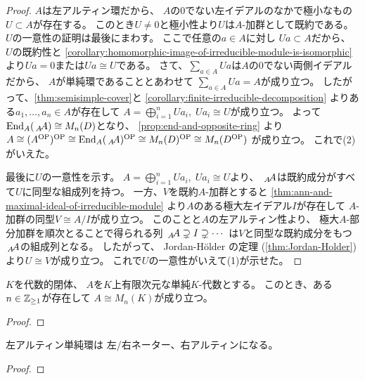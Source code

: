 \documentclass[report]{jlreq}
\begin{document}
\begin{proof}
    $A$は左アルティン環だから、
    $A$の$0$でない左イデアルのなかで極小なもの$U \subset A$が存在する。
    このとき$U \neq 0$と極小性より$U$は$A$-加群として既約である。
    $U$の一意性の証明は最後にまわす。
    ここで任意の$a \in A$に対し
    $Ua \subset A$だから、
    $U$の既約性と
    \cref{corollary:homomorphic-image-of-irreducible-module-is-isomorphic}
    より$Ua = 0$または$Ua \cong U$である。
    さて、$\sum_{a \in A} Ua$は$A$の$0$でない両側イデアルだから、
    $A$が単純環であることとあわせて
    $\sum_{a \in A} Ua = A$が成り立つ。
    したがって、\cref{thm:semisimple-cover}と
    \cref{corollary:finite-irreducible-decomposition}
    よりある$a_1, \dots, a_n \in A$が存在して
    $A = \bigoplus_{i = 1}^n Ua_i, \; Ua_i \cong U$が成り立つ。
    よって$\operatorname{End}_A(\,{}_{A}\!A) \cong M_n(D)$となり、
    \cref{prop:end-and-opposite-ring}
    より
    $A \cong (A^{\mathrm{OP}})^{\mathrm{OP}}
        \cong \operatorname{End}_A(\,{}_{A}\!A)^{\mathrm{OP}}
        \cong M_n(D)^{\mathrm{OP}}
        \cong M_n(D^{\mathrm{OP}})$
    が成り立つ。
    これで(2)がいえた。

    最後に$U$の一意性を示す。
    $A = \bigoplus_{i = 1}^n Ua_i, \; Ua_i \cong U$より、
    $\,{}_{A}\!A$は既約成分がすべて$U$に同型な組成列を持つ。
    一方、$V$を既約$A$-加群とすると
    \cref{thm:ann-and-maximal-ideal-of-irreducible-module}
    より$A$のある極大左イデアル$I$が存在して
    $A$-加群の同型$V \cong A / I$が成り立つ。
    このことと$A$の左アルティン性より、
    極大$A$-部分加群を順次とることで得られる列
    $\,{}_{A}\!A \supsetneq I \supsetneq \cdots$
    は$V$と同型な既約成分をもつ$\,{}_{A}\!A$の組成列となる。
    したがって、
    Jordan-H\"{o}lder の定理
    (\cref{thm:Jordan-Holder})
    より$U \cong V$が成り立つ。
    これで$U$の一意性がいえて(1)が示せた。
\end{proof}

\begin{corollary}
    $K$を代数的閉体、
    $A$を$K$上有限次元な単純$K$-代数とする。
    このとき、ある$n \in \mathbb{Z}_{\ge 1}$が存在して
    $A \cong M_n(K)$が成り立つ。
\end{corollary}

\begin{proof}
    \TODO{}
\end{proof}

\begin{corollary}
    左アルティン単純環は
    左/右ネーター、右アルティンになる。
\end{corollary}

\begin{proof}
    \TODO{}
\end{proof}
\end{document}
